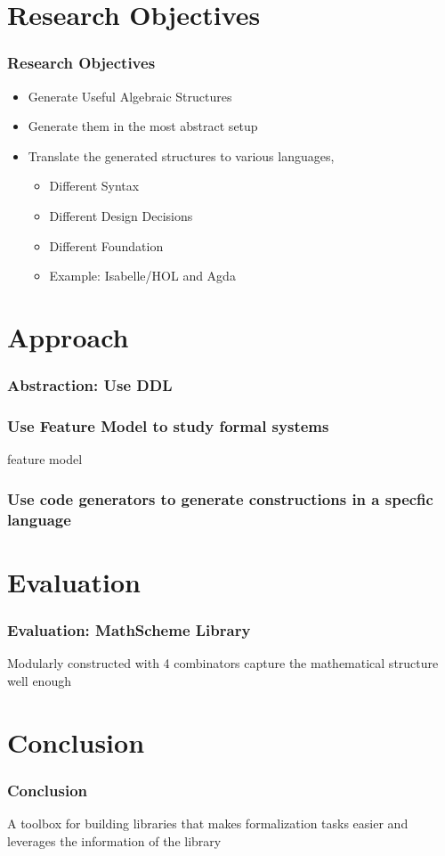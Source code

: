 \documentclass[t,12pt,numbers,fleqn,usenames,xcolor=dvipsnames]{beamer}
\begin{document}
\section{Research Objectives}
\begin{frame}
\frametitle{Research Objectives}
\begin{itemize}
	\item Generate Useful Algebraic Structures 
	\item Generate them in the most abstract setup 
	\item Translate the generated structures to various languages, 
	  \begin{itemize}
	  	\item Different Syntax
	  	\item Different Design Decisions
	  	\item Different Foundation 
	  	\item Example: Isabelle/HOL and Agda 
	  \end{itemize}
\end{itemize}
\end{frame}

\section{Approach}
\begin{frame}[fragile]
\frametitle{Abstraction: Use DDL}

\end{frame}

\begin{frame}
\frametitle{Use Feature Model to study formal systems}
feature model 
\end{frame}

\begin{frame}
\frametitle{Use code generators to generate constructions in a specfic language}
\end{frame}

\section{Evaluation}
\begin{frame}
\frametitle{Evaluation: MathScheme Library}
Modularly constructed with 4 combinators 
capture the mathematical structure well enough 
\end{frame}

\section{Conclusion}
\begin{frame}
\frametitle{Conclusion}
A toolbox for building libraries that makes formalization tasks easier and leverages the information of the library 
\end{frame}
\end{document}
